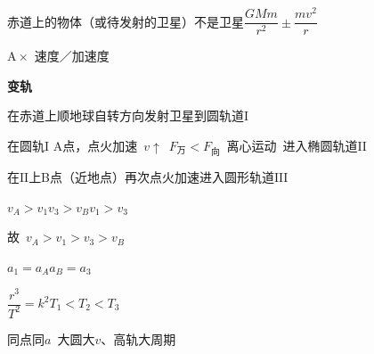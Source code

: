 
赤道上的物体（或待发射的卫星）不是卫星\quad $\dfrac{GMm}{r^{2}}\pm\dfrac{mv^{2}}{r}$

A\,$\times$\ 速度／加速度

\textbf{变轨}


在赤道上顺地球自转方向发射卫星到圆轨道$\mathrm{I}$

在圆轨$\mathrm{I}$ A点，点火加速\ $v\uparrow$\ $F_{\text{万}}<F_{\text{向}}$\ 离心运动\ 进入椭圆轨道$\mathrm{II}$

在$\mathrm{II}$上B点（近地点）再次点火加速进入圆形轨道$\mathrm{III}$%

$v_A>v_1$\qquad $v_3>v_B$\qquad $v_1>v_3$

故\ $v_A>v_1>v_3>v_B$

$a_1=a_A$\qquad $a_B=a_3$

$\dfrac{r^{3}}{T^{2}}=k^{2}$\qquad $T_1<T_2<T_3$%

同点同$a$\ 大圆大$v$、高轨大周期

